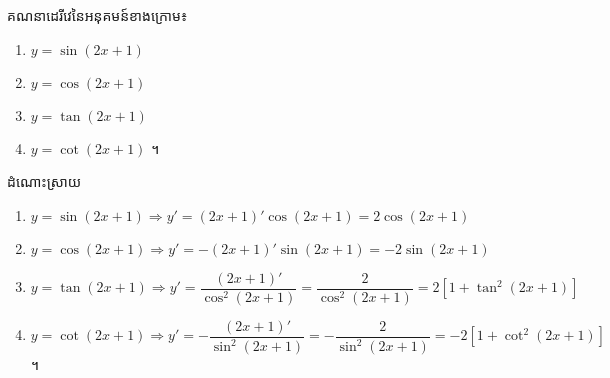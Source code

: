 \documentclass[12pt,fleqn]{book} %
\newcommand{\answer}{\begin{center}
\kml \color{magenta} ដំណោះស្រាយ
\end{center}}
\begin{document}
\begin{example}
គណនាដេរីវេនៃអនុគមន៍ខាងក្រោម៖
\begin{multicols}{2}
\begin{enumerate}
\item $y=\sin (2x+1)$
\item $y=\cos (2x+1)$
\item $y=\tan (2x+1)$
\item $y=\cot (2x+1)$ ។
\end{enumerate}
\end{multicols}
\end{example}
\answer 
\begin{enumerate}
\item $y=\sin (2x+1) \Rightarrow y'=(2x+1)'\cos (2x+1)=2\cos (2x+1)$
\item $y=\cos (2x+1)\Rightarrow y'=-(2x+1)'\sin (2x+1)=-2\sin (2x+1)$
\item $y=\tan (2x+1)\Rightarrow y'=\dfrac{(2x+1)'}{\cos^2 (2x+1)}=\dfrac{2}{\cos^2 (2x+1)}=2[1+\tan^2(2x+1)]$
\item $y=\cot (2x+1)\Rightarrow y'=-\dfrac{(2x+1)'}{\sin ^2 (2x+1)}=-\dfrac{2}{\sin^2 (2x+1)}=-2[1+\cot^2 (2x+1)]$ ។
\end{enumerate}
\end{document}
